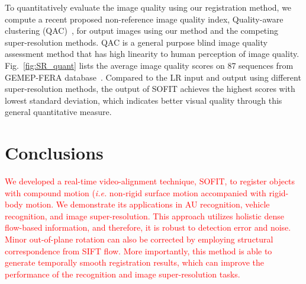 \documentclass[10pt,journal]{IEEEtran}
\newcommand{\Songfan}[1]{\textcolor{red}{#1}}
\begin{document}
To quantitatively evaluate the image quality using our registration method, we compute a recent proposed non-reference image quality index, Quality-aware clustering (QAC)~\cite{Xue_CVPR13}, for output images using our method and the competing super-resolution methods. QAC is a general purpose blind image quality assessment method that has high linearity to human perception of image quality. Fig.~\ref{fig:SR_quant} lists the average image quality scores on 87 sequences from GEMEP-FERA database~\cite{FERA11}. Compared to the LR input and output using different super-resolution methods, the output of SOFIT achieves the highest scores with lowest standard deviation, which indicates better visual quality through this general quantitative measure.



\section{Conclusions\label{sec:conclusion}}

\Songfan{
We developed a real-time video-alignment technique, SOFIT, to register objects with compound motion (\textit{i.e.} non-rigid surface motion accompanied with rigid-body motion. We demonstrate its applications in AU recognition, vehicle recognition, and image super-resolution. This approach utilizes holistic dense flow-based information, and therefore, it is robust to detection error and noise. Minor out-of-plane rotation can also be corrected by employing structural correspondence from SIFT flow. More importantly, this method is able to generate temporally smooth registration results, which can improve the performance of the recognition and image super-resolution tasks.
}

%

\ifCLASSOPTIONcaptionsoff
  \newpage
\fi



\end{document}
